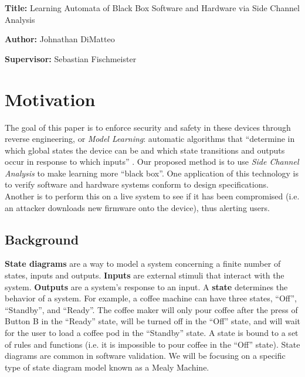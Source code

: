 \documentclass[11pt, a4paper]{article}
\newcommand{\namelistlabel}[1]{\mbox{#1}\hfil}
\newenvironment{namelist}[1]{%
\begin{list}{}
    {
        \let\makelabel\namelistlabel
        \settowidth{\labelwidth}{#1}
        \setlength{\leftmargin}{1.1\labelwidth}
    }
  }{%
\end{list}}
\begin{document}
\begin{namelist}{xxxxxxxxxxxx}
\item[{\bf Title:}]
    Learning Automata of Black Box Software and Hardware via Side Channel Analysis
\item[{\bf Author:}]
	Johnathan DiMatteo
\item[{\bf Supervisor:}]
	Sebastian Fischmeister
\end{namelist}

\section*{Motivation}

The goal of this paper is to enforce security and safety in these devices through reverse engineering, or \textit{Model Learning}:
automatic algorithms that ``determine in which global states the device can be and which state transitions and outputs occur in response to which inputs'' \cite{vaandrager2017model}.
Our proposed method is to use \textit{Side Channel Analysis} to make learning more ``black box''.
One application of this technology is to verify software and hardware systems conform to design specifications.
Another is to perform this on a live system to see if it has been compromised (i.e. an attacker downloads new firmware onto the device), thus alerting users.

\subsection*{Background}

\textbf{State diagrams} are a way to model a system concerning a finite number of states, inputs and outputs.
\textbf{Inputs} are external stimuli that interact with the system.
\textbf{Outputs} are a system's response to an input.
A \textbf{state} determines the behavior of a system.
For example, a coffee machine can have three states, ``Off'', ``Standby'', and ``Ready''.
The coffee maker will only pour coffee after the press of Button B in the ``Ready'' state, will be turned off in the ``Off'' state, and will wait for the user to load a coffee pod in the ``Standby'' state.
A state is bound to a set of rules and functions (i.e. it is impossible to pour coffee in the ``Off'' state).
State diagrams are common in software validation.
We will be focusing on a specific type of state diagram model known as a Mealy Machine.
\end{document}
